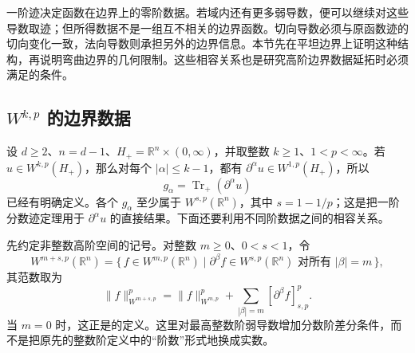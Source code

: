 
一阶迹决定函数在边界上的零阶数据。若域内还有更多弱导数，便可以继续对这些导数取迹；但所得数据不是一组互不相关的边界函数。切向导数必须与原函数迹的切向变化一致，法向导数则承担另外的边界信息。本节先在平坦边界上证明这种结构，再说明弯曲边界的几何限制。这些相容关系也是研究高阶边界数据延拓时必须满足的条件。

\subsection{\texorpdfstring{\(W^{k,p}\)}{Wk,p} 的边界数据}
\label{b1:subsec:230401}

设 \(d\ge2\)、\(n=d-1\)、\(H_+=\mathbb R^n\times(0,\infty)\)，并取整数 \(k\ge1\)、\(1<p<\infty\)。若 \(u\in W^{k,p}(H_+)\)，那么对每个 \(|\alpha|\le k-1\)，都有 \(\partial^\alpha u\in W^{1,p}(H_+)\)，所以
\[
 g_\alpha=\operatorname{Tr}_+(\partial^\alpha u)
\]
已经有明确定义。各个 \(g_\alpha\) 至少属于 \(W^{s,p}(\mathbb R^n)\)，其中 \(s=1-1/p\)；这是把一阶分数迹定理用于 \(\partial^\alpha u\) 的直接结果。下面还要利用不同阶数据之间的相容关系。

\ProseParagraphBreak

先约定非整数高阶空间的记号。对整数 \(m\ge0\)、\(0<s<1\)，令
\[
 W^{m+s,p}(\mathbb R^n)
 =\{\,f\in W^{m,p}(\mathbb R^n)
       \mid \partial^\beta f\in W^{s,p}(\mathbb R^n)
               \text{ 对所有 }|\beta|=m\,\},
\]
其范数取为
\[
 \|f\|_{W^{m+s,p}}^p
 =\|f\|_{W^{m,p}}^p+
     \sum_{|\beta|=m}[\partial^\beta f]_{s,p}^p.
\]
当 \(m=0\) 时，这正是的定义。这里对最高整数阶弱导数增加分数阶差分条件，而不是把原先的整数阶定义中的“阶数”形式地换成实数。

